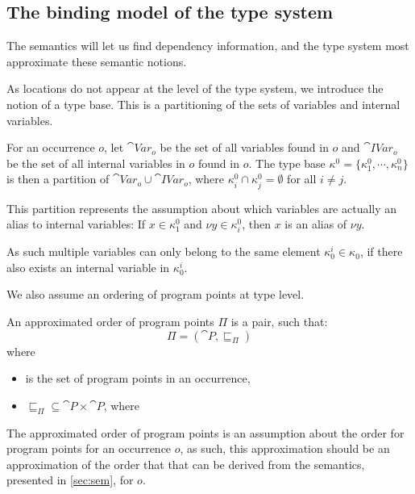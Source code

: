 \documentclass[acmsmall,sigplan]{acmart}
\begin{document}
\subsection{The binding model of the type system}\label{sec:basis}

The semantics will let us find dependency information, and the type 
system most approximate these semantic notions.

As locations do not appear at the level of the type system, we
introduce the notion of a type base. This is a partitioning of the
sets of variables and internal variables. 

\begin{definition}
	For an occurrence $o$, let $\cat{Var}_o$ be the set of all
        variables found in $o$ and $\cat{IVar}_o$ be the set of all
        internal variables in $o$ found in $o$.
	The type base $\kappa^0=\{\kappa^0_1,\cdots,\kappa^0_n\}$ is
        then a partition of $\cat{Var}_o \cup \cat{IVar}_o$, where
        $\kappa_i^0\cap\kappa_j^0=\emptyset$ for all $i\neq j$. 
\end{definition}

This partition represents the assumption about which variables are
actually an alias to internal variables: If $x \in \kappa^0_1$ and
$\nu y \in \kappa^0_i$, then $x$ is an alias of $\nu y$.

As such multiple variables can only belong to the same element
$\kappa_0^i\in\kappa_0$, if there also exists an internal variable in
$\kappa_0^i$. 

We also assume an ordering of program points at type level.

\begin{definition}
	An approximated order of program points $\Pi$ is a pair, such that: 
	$$\Pi=(\cat{P},\sqsubseteq_\Pi)$$
	where
	\begin{itemize}
		\item {} is the set of program points in an occurrence,
		\item $\sqsubseteq_\Pi\subseteq\cat{P}\times\cat{P}$, where
	\end{itemize}
\end{definition}

The approximated order of program points is an assumption about the
order for program points for an occurrence $o$, as such, this
approximation should be an approximation of the order that that can be
derived from the semantics, presented in \cref{sec:sem}, for $o$. 
\end{document}
